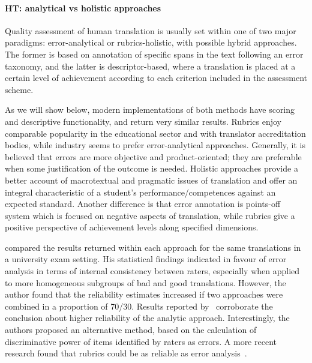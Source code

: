 \paragraph{\label{par:ht_ass}HT: analytical vs holistic approaches} Quality assessment of human translation is usually set within one of two major paradigms: error-analytical or rubrics-holistic, with possible hybrid approaches. The former is based on annotation of specific spans in the text following an error taxonomy, and the latter is descriptor-based, where a translation is placed at a certain level of achievement according to each criterion included in the assessment scheme. 

As we will show below, modern implementations of both methods have scoring and descriptive functionality, and return very similar results. 
Rubrics enjoy comparable popularity in the educational sector and with translator accreditation bodies, while industry seems to prefer error-analytical approaches. Generally, it is believed that errors are more objective and product-oriented; they are preferable when some justification of the outcome is needed. Holistic approaches provide a better account of macrotextual and pragmatic issues of translation and offer an integral characteristic of a student's performance/competences against an expected standard. 
Another difference is that error annotation is points-off system which is focused on negative aspects of translation, while rubrics give a positive perspective of achievement levels along specified dimensions.

\citet{Waddington2001} compared the results returned within each approach for the same translations in a university exam setting. His statistical findings indicated in favour of error analysis in terms of internal consistency between raters, especially when applied to more homogeneous subgroups of bad and good translations. However, the author found that the reliability estimates increased if two approaches were combined in a proportion of 70/30. Results reported by~\citet{Eyckmans2009} corroborate the conclusion about higher reliability of the analytic approach. Interestingly, the authors proposed an alternative method, based on the calculation of discriminative power of items identified by raters as errors. A more recent research found that rubrics could be as reliable as error analysis~\cite{Turner2010}.

